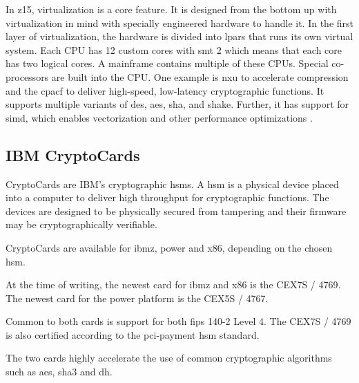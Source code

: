 In \gls{z15}, virtualization is a core feature. It is designed from the bottom up with virtualization in mind with specially engineered hardware to handle it. In the first layer of virtualization, the hardware is divided into \glspl{lpar} that runs its own virtual system. Each CPU has 12 custom cores with \gls{smt} 2 which means that each core has two logical cores. A mainframe contains multiple of these CPUs. Special co-processors are built into the CPU. One example is \gls{nxu} to accelerate compression and the \gls{cpacf} to deliver high-speed, low-latency cryptographic functions. It supports multiple variants of \gls{des}, \gls{aes}, \gls{sha}, and \gls{shake}. Further, it has support for \gls{simd}, which enables vectorization and other performance optimizations  \cite{redbook:z15}.


\subsection{IBM CryptoCards}

CryptoCards are IBM's cryptographic \glspl{hsm}. A \gls{hsm} is a physical device placed into a computer to deliver high throughput for cryptographic functions. The devices are designed to be physically secured from tampering and their firmware may be cryptographically verifiable\cite{ibm:hsms}.

CryptoCards are available for \gls{ibmz}, \gls{power} and \gls{x86}, depending on the chosen \gls{hsm}.

At the time of writing, the newest card for \gls{ibmz} and \gls{x86} is the CEX7S / 4769\cite{ibm:4769}. The newest card for the \gls{power} platform is the CEX5S / 4767\cite{ibm:4767}.

Common to both cards is support for both \gls{fips} 140-2 Level 4. The CEX7S / 4769 is also certified according to the \gls{pci-payment} \gls{hsm} standard\cite{ibm:4769,ibm:4767}.

The two cards highly accelerate the use of common cryptographic algorithms such as \gls{aes}, \gls{sha3} and \gls{dh}\cite{ibm:4767,ibm:4769}.